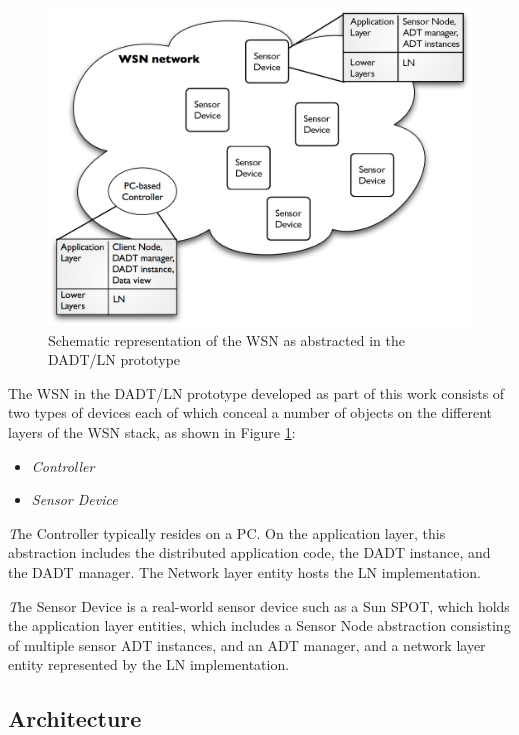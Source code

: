 \begin{figure}
\centering
\includegraphics[scale=0.55]{img/DADTLN_glossary.eps} 
\caption[WSN in DADT/LN prototype]{Schematic representation of the WSN as
abstracted in the DADT/LN prototype}
\label{Fig:DADTLN_glossary}
\end{figure} 

The WSN in the DADT/LN prototype developed as part of
this work consists of two types of devices each of which conceal a number
of objects on the different layers of the WSN stack, as shown in Figure
\ref{Fig:DADTLN_glossary}:

\begin{itemize}
  \item \emph{Controller}
  \item \emph{Sensor Device}
\end{itemize}  
   
\emph The {Controller} typically resides on a PC. On the application layer, this
abstraction includes the distributed application code, the DADT
instance, and the DADT manager. The Network layer entity hosts the LN implementation.
  
\emph The {Sensor Device} is a real-world sensor device such as a Sun SPOT, 
which holds the application layer entities, which includes a Sensor Node
abstraction consisting of multiple sensor ADT instances, and an ADT
manager, and a network layer entity represented by the LN implementation.

\subsection{Architecture}

